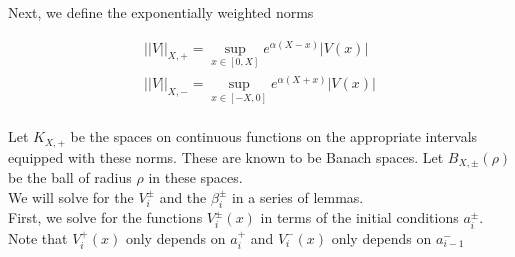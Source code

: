 \documentclass[12pt]{article}
\begin{document}
Next, we define the exponentially weighted norms

\begin{align*}
||V||_{X, +} = \sup_{x \in [0, X]} e^{\alpha(X - x)}|V(x)| \\
||V||_{X, -} = \sup_{x \in [-X, 0]} e^{\alpha(X + x)}|V(x)| \\
\end{align*}

Let $K_{X, +}$ be the spaces on continuous functions on the appropriate intervals equipped with these norms. These are known to be Banach spaces. Let $B_{X, \pm}(\rho)$ be the ball of radius $\rho$ in these spaces.\\

We will solve for the $V_i^\pm$ and the $\beta_i^\pm$ in a series of lemmas.\\

First, we solve for the functions $V_i^\pm(x)$ in terms of the initial conditions $a_i^\pm$. Note that $V_i^+(x)$ only depends on $a_i^+$ and $V_i^-(x)$ only depends on $a_{i-1}^-$

\end{document}
